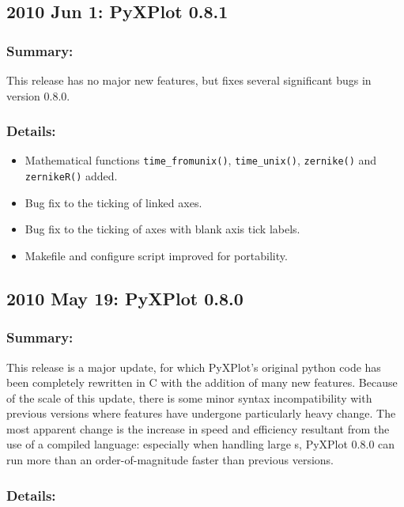 \subsection*{2010 Jun 1: PyXPlot 0.8.1}

\subsubsection*{Summary:}

This release has no major new features, but fixes several significant bugs in version 0.8.0.

\subsubsection*{Details:}

\begin{itemize}
\item Mathematical functions {\tt time\_\-from\-unix()}, {\tt time\_\-unix()}, {\tt zernike()} and {\tt zernikeR()} added.
\item Bug fix to the ticking of linked axes.
\item Bug fix to the ticking of axes with blank axis tick labels.
\item Makefile and configure script improved for portability.
\end{itemize}

\subsection*{2010 May 19: PyXPlot 0.8.0}

\subsubsection*{Summary:}

This release is a major update, for which PyXPlot's original python code has
been completely rewritten in C with the addition of many new features. Because
of the scale of this update, there is some minor syntax incompatibility with
previous versions where features have undergone particularly heavy change. The
most apparent change is the increase in speed and efficiency resultant from the
use of a compiled language: especially when handling large \datafile s, PyXPlot
0.8.0 can run more than an order-of-magnitude faster than previous versions.

\subsubsection*{Details:}

